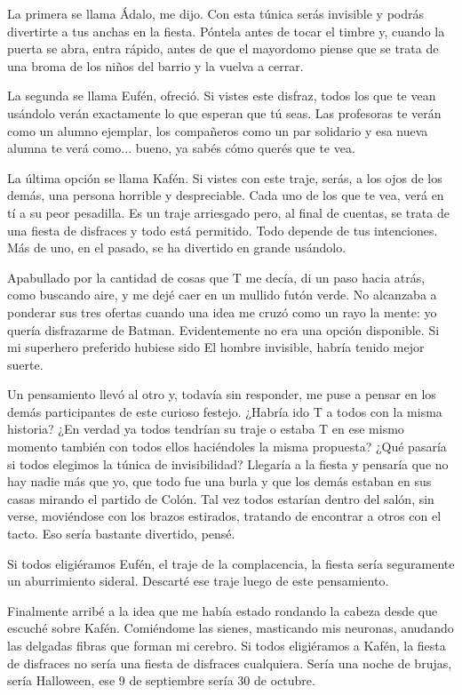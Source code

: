 \documentclass[11pt,twoside,openright,a5paper]{book}
\begin{document}
La primera se llama Ádalo, me dijo. Con esta túnica serás invisible y podrás divertirte a tus anchas en la fiesta. Póntela antes de tocar el timbre y, cuando la puerta se abra, entra rápido, antes de que el mayordomo piense que se trata de una broma de los niños del barrio y la vuelva a cerrar.

La segunda se llama Eufén, ofreció. Si vistes este disfraz, todos los que te vean usándolo verán exactamente lo que esperan que tú seas. Las profesoras te verán como un alumno ejemplar, los compañeros como un par solidario y esa nueva alumna te verá como... bueno, ya sabés cómo querés que te vea.

La última opción se llama Kafén. Si vistes con este traje, serás, a los ojos de los demás, una persona horrible y despreciable. Cada uno de los que te vea, verá en tí a su peor pesadilla. Es un traje arriesgado pero, al final de cuentas, se trata de una fiesta de disfraces y todo está permitido. Todo depende de tus intenciones. Más de uno, en el pasado, se ha divertido en grande usándolo.

Apabullado por la cantidad de cosas que T me decía, di un paso hacia atrás, como buscando aire, y me dejé caer en un mullido futón verde. No alcanzaba a ponderar sus tres ofertas cuando una idea me cruzó como un rayo la mente: yo quería disfrazarme de Batman. Evidentemente no era una opción disponible. Si mi superhero preferido hubiese sido El hombre invisible, habría tenido mejor suerte.

Un pensamiento llevó al otro y, todavía sin responder, me puse a pensar en los demás participantes de este curioso festejo. ¿Habría ido T a todos con la misma historia? ¿En verdad ya todos tendrían su traje o estaba T en ese mismo momento también con todos ellos haciéndoles la misma propuesta? ¿Qué pasaría si todos elegimos la túnica de invisibilidad? Llegaría a la fiesta y pensaría que no hay nadie más que yo, que todo fue una burla y que los demás estaban en sus casas mirando el partido de Colón. Tal vez todos estarían dentro del salón, sin verse, moviéndose con los brazos estirados, tratando de encontrar a otros con el tacto. Eso sería bastante divertido, pensé.

Si todos eligiéramos Eufén, el traje de la complacencia, la fiesta sería seguramente un aburrimiento sideral. Descarté ese traje luego de este pensamiento.

Finalmente arribé a la idea que me había estado rondando la cabeza desde que escuché sobre Kafén. Comiéndome las sienes, masticando mis neuronas, anudando las delgadas fibras que forman mi cerebro. Si todos eligiéramos a Kafén, la fiesta de disfraces no sería una fiesta de disfraces cualquiera. Sería una noche de brujas, sería Halloween, ese 9 de septiembre sería 30 de octubre.
\end{document}
